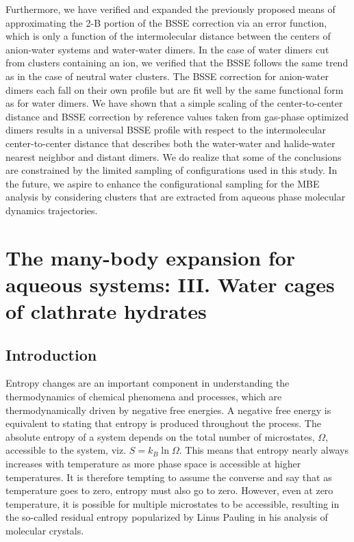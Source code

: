 \documentclass[11pt, proquest]{uwthesis}[2020/02/24]
\begin{document}
\par Furthermore, we have verified and expanded the previously proposed means of approximating the 2-B portion of the BSSE correction via an error function, which is only a function of the intermolecular distance between the centers of anion-water systems and water-water dimers. In the case of water dimers cut from clusters containing an ion, we verified that the BSSE follows the same trend as in the case of neutral water clusters. The BSSE correction for anion-water dimers each fall on their own profile but are fit well by the same functional form as for water dimers. We have shown that a simple scaling of the center-to-center distance and BSSE correction by reference values taken from gas-phase optimized dimers results in a universal BSSE profile with respect to the intermolecular center-to-center distance that describes both the water-water and halide-water nearest neighbor and distant dimers. We do realize that some of the conclusions are constrained by the limited sampling of configurations used in this study. In the future, we aspire to enhance the configurational sampling for the MBE analysis by considering clusters that are extracted from aqueous phase molecular dynamics trajectories.

\chapter{The many-body expansion for aqueous systems: III. Water cages of clathrate hydrates}
\label{ch:clathrates}

\section{Introduction}

\par Entropy changes are an important component in understanding the thermodynamics of chemical phenomena and processes, which are thermodynamically driven by negative free energies. A negative free energy is equivalent to stating that entropy is produced throughout the process. The absolute entropy of a system depends on the total number of microstates, $\Omega$, accessible to the system, viz. $S=k_B\ln\Omega$. This means that entropy nearly always increases with temperature as more phase space is accessible at higher temperatures. It is therefore tempting to assume the converse and say that as temperature goes to zero, entropy must also go to zero. However, even at zero temperature, it is possible for multiple microstates to be accessible, resulting in the so-called residual entropy popularized by Linus Pauling in his analysis of molecular crystals.\autocite{pauling_structure_1935}
\end{document}

